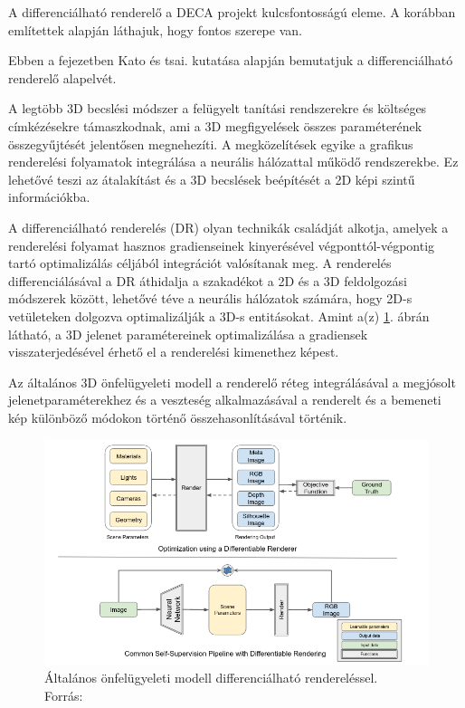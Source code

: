 \documentclass[12pt,a4]{article}
\begin{document}
                A differenciálható renderelő a DECA projekt kulcsfontosságú eleme. A korábban említettek alapján láthajuk, hogy fontos szerepe van.

                 Ebben a fejezetben Kato és tsai. \cite{diffrenderer} kutatása alapján bemutatjuk a differenciálható renderelő alapelvét.

                A legtöbb 3D becslési módszer a felügyelt tanítási rendszerekre és költséges címkézésekre támaszkodnak, ami
                a 3D megfigyelések összes paraméterének összegyűjtését jelentősen megnehezíti. A megközelítések egyike a grafikus renderelési folyamatok integrálása a neurális hálózattal működő rendszerekbe. Ez lehetővé teszi az átalakítást és a 3D becslések beépítését a 2D képi szintű információkba.

                A differenciálható renderelés (DR) olyan technikák családját alkotja, amelyek a renderelési folyamat hasznos gradienseinek kinyerésével végponttól-végpontig tartó optimalizálás céljából integrációt valósítanak meg. A renderelés differenciálásával a DR áthidalja a szakadékot
                a 2D és a 3D feldolgozási módszerek között, lehetővé téve a neurális hálózatok számára, hogy 2D-s vetületeken dolgozva optimalizálják a 3D-s entitásokat. Amint a(z) \ref{fig:diffrenderer}. ábrán látható, a 3D jelenet paramétereinek optimalizálása a gradiensek visszaterjedésével érhető el a renderelési kimenethez képest. 

                Az általános 3D önfelügyeleti modell a renderelő réteg integrálásával a megjósolt jelenetparaméterekhez és a veszteség alkalmazásával a renderelt és a bemeneti kép különböző módokon történő összehasonlításával történik.

                \begin{figure}[h!]	
            		\centering
            		\includegraphics[width=1\linewidth]{diffrenderer}
            		\caption{Általános önfelügyeleti modell differenciálható rendereléssel.\\
                            Forrás: \cite{diffrenderer}}
                    \label{fig:diffrenderer}
            	\end{figure}
\end{document}
